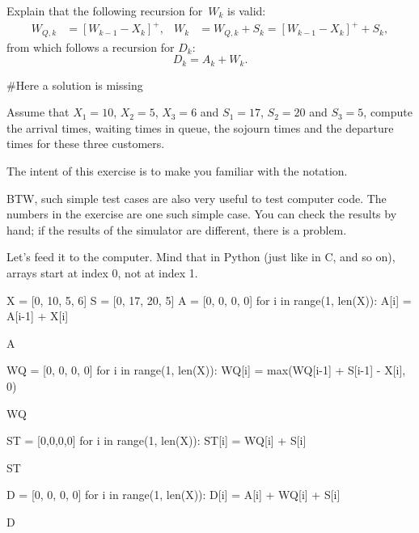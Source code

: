 \begin{extra}
 Explain that the following recursion for~$W_k$ is valid:
\begin{align}
 \label{eq:59}
 W_{Q,k} &= [W_{k-1} - X_k]^+, &
 W_{k} &= W_{Q,k} + S_k = [W_{k-1} - X_k]^+ + S_k,
\end{align}
from which follows a recursion for $D_k$:
\begin{equation}
 D_k = A_k + W_k.
\end{equation}
\end{extra}
#Here a solution is missing
\begin{extra}
 Assume that $X_1=10$, $X_2=5$, $X_3=6$ and $S_1 = 17$, $S_2=20$ and $S_3=5$, compute the arrival times, waiting times in queue, the sojourn times and the departure times for these three customers.
\begin{hint}
 The intent of this exercise is to make you familiar with the notation.

 BTW, such simple test cases are also very useful to test computer code.
 The numbers in the exercise are one such simple case.
 You can check the results by hand; if the results of the simulator are different, there is a problem.
\end{hint}
\begin{solution} Let's feed it to the computer. Mind that in Python (just like in C, and so on), arrays start at index 0, not at index 1. 
\begin{pyconsole}
X = [0, 10, 5, 6] 
S = [0, 17, 20, 5]
A = [0, 0, 0, 0]
for i in range(1, len(X)):
 A[i] = A[i-1] + X[i]

A

WQ = [0, 0, 0, 0]
for i in range(1, len(X)):
 WQ[i] = max(WQ[i-1] + S[i-1] - X[i], 0)

WQ

ST = [0,0,0,0]
for i in range(1, len(X)):
 ST[i] = WQ[i] + S[i]

ST

D = [0, 0, 0, 0]
for i in range(1, len(X)):
 D[i] = A[i] + WQ[i] + S[i]

D
\end{pyconsole}
 
\end{solution}
\end{extra}



